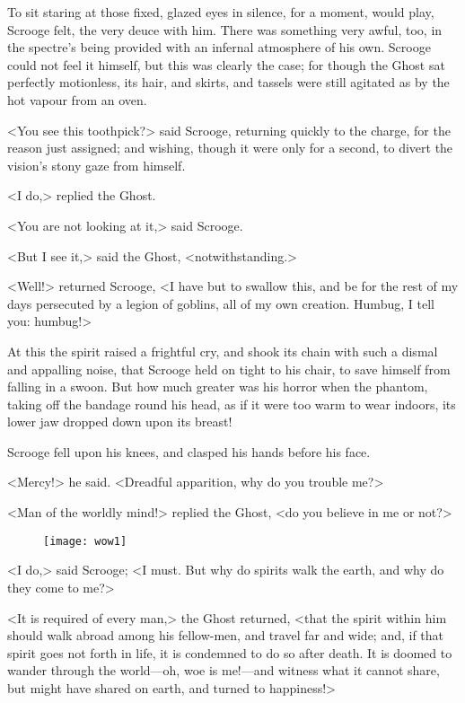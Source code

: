 To sit staring at those fixed, glazed eyes in silence, for a moment, would play, Scrooge felt, the very deuce with him. There was something very awful, too, in the spectre's being provided with an infernal atmosphere of his own. Scrooge could not feel it himself, but this was clearly the case; for though the Ghost sat perfectly motionless, its hair, and skirts, and tassels were still agitated as by the hot vapour from an oven.

<You see this toothpick?> said Scrooge, returning quickly to the charge, for the reason just assigned; and wishing, though it were only for a second, to divert the vision's stony gaze from himself.

<I do,> replied the Ghost.

<You are not looking at it,> said Scrooge.

<But I see it,> said the Ghost, <notwithstanding.>

<Well!> returned Scrooge, <I have but to swallow this, and be for the rest of my days persecuted by a legion of goblins, all of my own creation. Humbug, I tell you: humbug!>

At this the spirit raised a frightful cry, and shook its chain with such a dismal and appalling noise, that Scrooge held on tight to his chair, to save himself from falling in a swoon. But how much greater was his horror when the phantom, taking off the bandage round his head, as if it were too warm to wear indoors, its lower jaw dropped down upon its breast!

Scrooge fell upon his knees, and clasped his hands before his face.

<Mercy!> he said. <Dreadful apparition, why do you trouble me?>

<Man of the worldly mind!> replied the Ghost, <do you believe in me or not?>

\begin{letter}
	\begin{figure}[t!]
	\centering
	\vfill
		\texttt{[image: wow1]}
		\vfill
	\end{figure}
\end{letter}


<I do,> said Scrooge; <I must. But why do spirits walk the earth, and why do they come to me?>

<It is required of every man,> the Ghost returned, <that the spirit within him should walk abroad among his fellow-men, and travel far and wide; and, if that spirit goes not forth in life, it is condemned to do so after death. It is doomed to wander through the world—oh, woe is me!—and witness what it cannot share, but might have shared on earth, and turned to happiness!>


